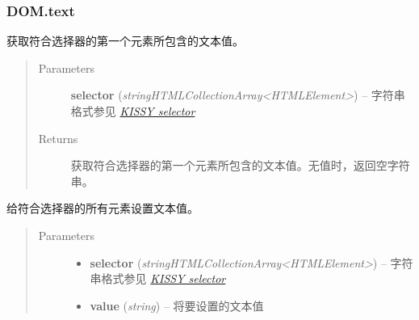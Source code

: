 \documentclass[letterpaper,10pt,english]{sphinxmanual}
\begin{document}
\subsubsection{DOM.text}
\label{api/core/dom/text:dom-text}\label{api/core/dom/text::doc}

\begin{fulllineitems}
\label{api/core/dom/text:DOM.text}
获取符合选择器的第一个元素所包含的文本值。
\begin{quote}\begin{description}
\item[{Parameters}] \leavevmode
\textbf{selector} (\emph{string\textbar{}HTMLCollection\textbar{}Array\textless{}HTMLElement\textgreater{}}) -- 字符串格式参见 {\hyperref[api/core/dom/selector:dom-selector]{\emph{KISSY selector}}}

\item[{Returns}] \leavevmode
获取符合选择器的第一个元素所包含的文本值。无值时，返回空字符串。

\end{description}\end{quote}

\end{fulllineitems}



\begin{fulllineitems}
给符合选择器的所有元素设置文本值。
\begin{quote}\begin{description}
\item[{Parameters}] \leavevmode\begin{itemize}
\item {}
\textbf{selector} (\emph{string\textbar{}HTMLCollection\textbar{}Array\textless{}HTMLElement\textgreater{}}) -- 字符串格式参见 {\hyperref[api/core/dom/selector:dom-selector]{\emph{KISSY selector}}}

\item {}
\textbf{value} (\emph{string}) -- 将要设置的文本值

\end{itemize}

\end{description}\end{quote}

\end{fulllineitems}
\end{document}
